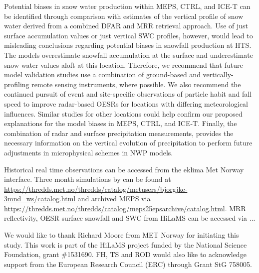 \documentclass{ametsocV5}
\begin{document}
    Potential biases in snow water production within MEPS, CTRL, and ICE-T can be identified through comparison with estimates of the vertical profile of snow water derived from a combined DFAR and MRR retrieval approach. Use of just surface accumulation values or just vertical SWC profiles, however, would lead to misleading conclusions regarding potential biases in snowfall production at HTS. The models overestimate snowfall accumulation at the surface and underestimate snow water values aloft at this location. Therefore, we recommend that future model validation studies use a combination of ground-based and vertically-profiling remote sensing instruments, where possible. We also recommend the continued pursuit of event and site-specific observations of particle habit and fall speed to improve radar-based OESRs for locations with differing meteorological influences. Similar studies for other locations could help confirm our proposed explanations for the model biases in MEPS, CTRL, and ICE-T. Finally, the combination of radar and surface precipitation measurements, provides the necessary information on the vertical evolution of precipitation to perform future adjustments in microphysical schemes in NWP models. 
    
    






%
\datastatement
Historical real time observations can be accessed from the eklima Met Norway interface.
Three month simulations by \citet{engdahl_effects_2020} can be found at \url{https://thredds.met.no/thredds/catalog/metusers/bjorgjke-3mnd_ws/catalog.html} and archived MEPS via \url{https://thredds.met.no/thredds/catalog/meps25epsarchive/catalog.html}. MRR reflectivity, OESR surface snowfall and SWC from HiLaMS can be accessed via ...

%
\acknowledgments
We would like to thank Richard Moore from MET Norway for initiating this study. This work is part of the HiLaMS project funded by the National Science Foundation, grant \#1531690. FH, TS and ROD would also like to acknowledge support from the European Research Council (ERC) through Grant StG 758005.
\end{document}

